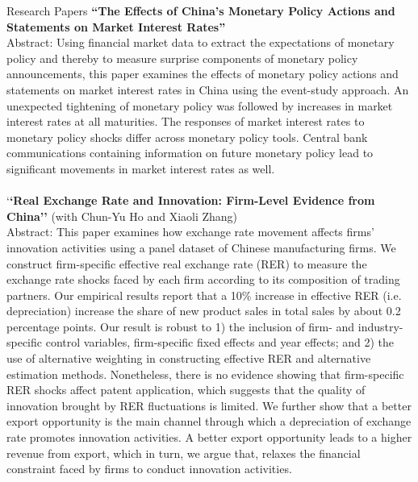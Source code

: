\documentclass{resume_liang} %
\begin{document}
\begin{rSection}{Research Papers}
\textbf{``The Effects of China's Monetary Policy Actions and Statements on Market Interest Rates''}\\
Abstract: Using financial market data to extract the expectations of monetary policy and thereby to measure surprise components of monetary policy announcements, this paper examines the effects of monetary policy actions and statements on market interest rates in China using the event-study approach. An unexpected tightening of monetary policy was followed by increases in market interest rates at all maturities. The responses of market interest rates to monetary policy shocks differ across monetary policy tools. Central bank communications containing information on future monetary policy lead to significant movements in market interest rates as well.
\\
\\
`\textbf{`Real Exchange Rate and Innovation: Firm-Level Evidence from China''} (with Chun-Yu Ho and Xiaoli Zhang) \\
Abstract: This paper examines how exchange rate movement affects firms' innovation activities using a panel dataset of Chinese manufacturing firms. We construct firm-specific effective real exchange rate (RER) to measure the exchange rate shocks faced by each firm according to its composition of trading partners.  Our empirical results report that a 10\% increase in effective RER (i.e. depreciation) increase the share of new product sales in total sales by about 0.2 percentage points. Our result is robust to 1) the inclusion of firm- and industry-specific control variables, firm-specific fixed effects and year effects; and 2) the use of alternative weighting in constructing effective RER and alternative estimation methods. Nonetheless, there is no evidence showing that firm-specific RER shocks affect patent application, which suggests that the quality of innovation brought by RER fluctuations is limited. We further show that a better export opportunity is the main channel through which a depreciation of exchange rate promotes innovation activities. A better export opportunity leads to a higher revenue from export, which in turn, we argue that, relaxes the financial constraint faced by firms to conduct innovation activities.
\\

\end{rSection}
\end{document}
